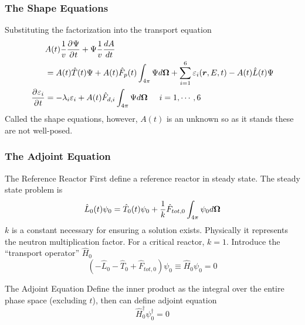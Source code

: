 \documentclass[10pt,compress]{beamer}
\begin{document}
\begin{frame}\frametitle{The Shape Equations}
    Substituting the factorization into the transport equation
    \begin{equation}
        \begin{split}
            &A(t)\frac{1}{v}\frac{\partial^{} \Psi}{\partial^{} t} + \Psi \frac{1}{v}\frac{dA}{dt} \\
            &= A(t)\hat{T}(t)\Psi + A(t)\hat{F}_p(t) \int_{4\pi}\Psi d\boldsymbol{\Omega} + \sum_{i=1}^6 \varepsilon_i(\boldsymbol{r}, E, t) - A(t)\hat{L}(t)\Psi\nonumber\\
            \frac{\partial^{} \varepsilon_i}{\partial^{} t} &= -\lambda_i \varepsilon_i + A(t)\hat{F}_{d,i}\int_{4\pi}\Psi d\boldsymbol{\Omega}\hspace{5mm} i=1,\cdots, 6
        \end{split}
    \end{equation}
    Called the shape equations, however, $A(t)$ is an unknown so as it stands these are not well-posed.
\end{frame}

\begin{frame}\frametitle{The Adjoint Equation}
    \begin{block}{The Reference Reactor}
        First define a reference reactor in steady state. The steady state problem is
        \begin{equation}
            \hat{L}_0(t)\psi_0=\hat{T}_0(t)\psi_0 +\frac{1}{k}\hat{F}_{tot,0}\int_{4\pi}\psi_0 d\boldsymbol{\Omega}\nonumber
        \end{equation}
        $k$ is a constant necessary for ensuring a solution exists. Physically it represents the neutron multiplication factor.
        For a critical reactor, $k=1$. Introduce the ``transport operator'' $\hat{H}_0$
        \begin{equation}
            (-\hat{L}_0 - \hat{T}_0 + \hat{F}_{tot,0})\psi_0 \equiv \hat{H}_0 \psi_0 =0\nonumber
        \end{equation}
    \end{block}
    \begin{block}{The Adjoint Equation}
        Define the inner product as the integral over the entire phase space (excluding $t$), then can define adjoint equation
        \begin{equation}
            \hat{H}_0^\dagger\psi_0^\dagger =0\nonumber
        \end{equation}
    \end{block}
\end{frame}
\end{document}

